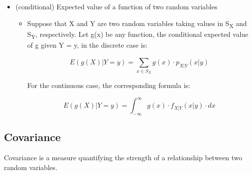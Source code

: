 \documentclass[12pt]{report}
\renewcommand{\_}{\kern-1.5pt\textunderscore\kern-1.5pt}
\begin{document}
\begin{itemize}
\begin{itemize}
\end{itemize}
	\item (conditional) Expected value of a function of two random variables\par

\begin{itemize}
	\item Suppose that X and Y are two random variables taking values in S\textsubscript{X} and S\textsubscript{Y}, respectively. Let g(x) be any function, the conditional expected value of g given Y = y, in the discrete case is:\par

 \[ E \left( g \left( X \right)  \vert Y=y \right) = \sum _{x \in S_{X}}^{}g \left( x \right)  \cdot p_{X \vert Y} \left( x \vert y \right)  \] \par

For the continuous case, the corresponding formula is:\par

 \[ E \left( g \left( X \right)  \vert Y=y \right) = \int _{-\infty}^{\infty}g \left( x \right)  \cdot f_{X \vert Y} \left( x \vert y \right)  \cdot dx \] \par


\end{itemize}
\end{itemize}\subsection*{Covariance}
Covariance is a measure quantifying the strength of a relationship between two random variables.\par
\end{document}
